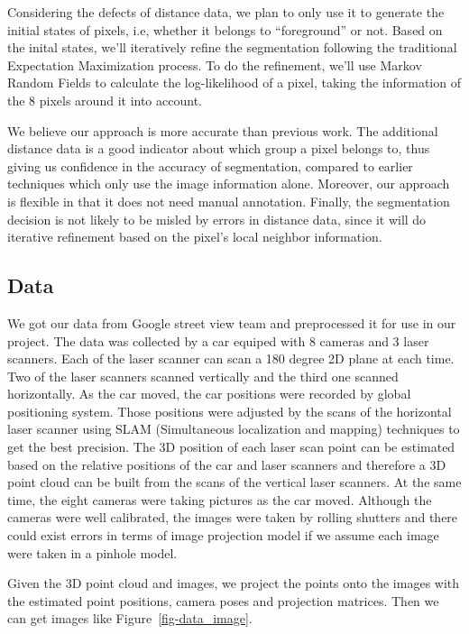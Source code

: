 \documentclass{article} %
\begin{document}
Considering the defects of distance data, we plan to only use it to
generate the initial states of pixels, i.e,
 whether it belongs to ``foreground'' or not. Based on the inital
 states, we'll iteratively refine the segmentation following the
 traditional Expectation Maximization process. To do the refinement,
 we'll use Markov Random Fields to calculate the log-likelihood of a
 pixel, taking the information of the 8 pixels around it into account.

We believe our approach is more accurate than previous work. The additional 
distance data is a good indicator about which group a pixel belongs to, 
thus giving us confidence in the accuracy of segmentation, compared to earlier
 techniques which only use the image information alone. Moreover, our
 approach is flexible in that it does not need manual annotation. Finally, the
segmentation decision is not likely to be misled by errors in distance
data, since it will do iterative refinement based on the pixel's local
neighbor information.

\subsection{Data}

We got our data from Google street view team and preprocessed it for
use in our project. The data was collected by a car equiped
with 8 cameras and 3 laser scanners. Each of the laser scanner can
scan a 180 degree 2D plane at each time. Two of the laser scanners
scanned vertically and the third one scanned horizontally. As the car moved, the car
positions were recorded by global positioning system. Those positions
were adjusted by the scans of the horizontal laser scanner using SLAM
(Simultaneous localization and mapping) techniques to get the best
precision. The 3D position of each laser scan point can be
estimated based on the relative positions of the car and laser
scanners and therefore a 3D point cloud can be built from the scans of
the vertical laser scanners. At the same time, the eight
cameras were taking pictures as the car moved. Although the cameras
were well calibrated, the images were taken by rolling shutters and
there could exist errors in terms of image projection model if we assume each
image were taken in a pinhole model.

Given the 3D point cloud and images, we project the points onto the
images with the estimated point positions, camera poses and projection
matrices. Then we can get images like Figure~\ref{fig-data_image}.
\end{document}

